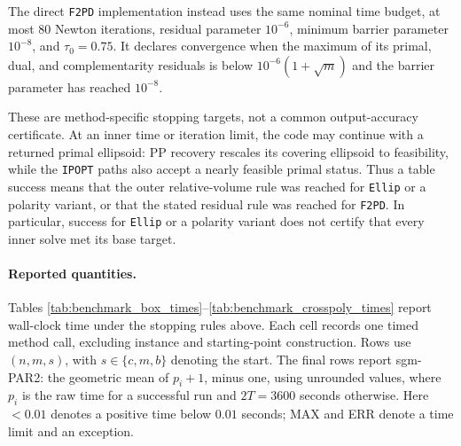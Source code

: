 \documentclass[smallextended]{svjour3}
\begin{document}
The direct \texttt{F2PD} implementation instead uses the same nominal time
budget, at most $80$ Newton iterations, residual parameter $10^{-6}$, minimum
barrier parameter $10^{-8}$, and $\tau_0=0.75$. It declares convergence when
the maximum of its primal, dual, and complementarity residuals is below
$10^{-6}(1+\sqrt m)$ and the barrier parameter has reached $10^{-8}$.

These are method-specific stopping targets, not a common output-accuracy
certificate. At an inner time or iteration limit, the code may
continue with a returned primal ellipsoid: PP recovery rescales its covering
ellipsoid to feasibility, while the \texttt{IPOPT} paths also accept a nearly
feasible primal status. Thus a table success means that the outer
relative-volume rule was reached for \texttt{Ellip} or a polarity variant, or
that the stated residual rule was reached for \texttt{F2PD}. In particular,
success for \texttt{Ellip} or a polarity variant does not certify that every
inner solve met its base target.


\paragraph{Reported quantities.}
Tables \ref{tab:benchmark_box_times}--\ref{tab:benchmark_crosspoly_times} report
wall-clock time under the stopping rules above. Each cell records one timed
method call, excluding instance and starting-point construction. Rows use
$(n,m,s)$, with $s\in\{c,m,b\}$ denoting the start. The final rows report
sgm-PAR2: the geometric mean of $p_i+1$, minus one,
using unrounded values, where $p_i$ is the raw time for a successful run and
$2T=3600$ seconds otherwise. Here $<0.01$ denotes a positive time below
$0.01$ seconds; MAX and ERR denote a time limit and an exception.
\end{document}
